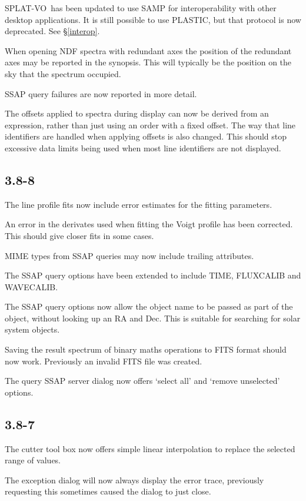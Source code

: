 \documentclass[twoside,11pt]{article}
\renewcommand{\_}{\texttt{\symbol{95}}}
\newcommand{\SPLAT}{\textsf{SPLAT-VO}}
\begin{document}
\SPLAT\ has been updated to use SAMP for interoperability with other
desktop applications. It is still possible to use PLASTIC, but that
protocol is now deprecated.
See \S\ref{interop}.

When opening NDF spectra with redundant axes the position of the
redundant axes may be reported in the synopsis. This will typically
be the position on the sky that the spectrum occupied.

SSAP query failures are now reported in more detail.

The offsets applied to spectra during display can now be derived from an
expression, rather than just using an order with a fixed offset. The
way that line identifiers are handled when applying offsets is also
changed. This should stop excessive data limits being used when most
line identifiers are not displayed.

\subsection{3.8-8}

The line profile fits now include error estimates for the fitting parameters.

An error in the derivates used when fitting the Voigt profile has been
corrected. This should give closer fits in some cases.

MIME types from SSAP queries may now include trailing attributes.

The SSAP query options have been extended to include TIME, FLUXCALIB
and WAVECALIB.

The SSAP query options now allow the object name to be passed as part
of the object, without looking up an RA and Dec. This is suitable
for searching for solar system objects.

Saving the result spectrum of binary maths operations to FITS format
should now work. Previously an invalid FITS file was created.

The query SSAP server dialog now offers `select all' and `remove
unselected' options.

\subsection{3.8-7}
The cutter tool box now offers simple linear interpolation to replace
the selected range of values.

The exception dialog will now always display the error trace, previously
requesting this sometimes caused the dialog to just close.
\end{document}
